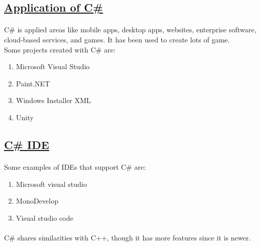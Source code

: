 \documentclass[[12pt]{article}
\begin{document}
	\subsection*{\underline{Application of C\# }}
	\paragraph{}
	C\# is applied areas like mobile apps, desktop apps, websites, enterprise software, cloud-based services, and games. It has been used to create lots of game.\\
	
	Some projects created with C\# are:

	
	\begin{enumerate}
		\item 	Microsoft Visual Studio
		\item 	Paint.NET
		\item 	Windows Installer XML
		\item 	Unity
			
		
			
	\end{enumerate}
	
	
	\subsection*{\underline{C\# IDE}}
	\paragraph{}
	Some examples of IDEs that support C\# are:

	\begin{enumerate}
		\item	Microsoft visual studio 
		\item	MonoDevelop
		\item	Visual studio code
	\end{enumerate}
	\paragraph{} 
		C\# shares similarities with C++, though it has more features since it is newer.
		
	\newpage
		
\end{document}
